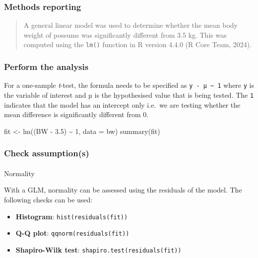 \documentclass[
  letterpaper,
  DIV=11,
  numbers=noendperiod]{scrartcl}
\makeatletter
\let\oldparagraph\paragraph
\renewcommand{\paragraph}{
    \@ifstar
      \xxxParagraphStar
      \xxxParagraphNoStar
  }
\newcommand{\xxxParagraphStar}[1]{\oldparagraph*{#1}\mbox{}}
\newcommand{\xxxParagraphNoStar}[1]{\oldparagraph{#1}\mbox{}}
\newenvironment{Shaded}{\begin{snugshade}}{\end{snugshade}}
\newcommand{\AttributeTok}[1]{\textcolor[rgb]{0.40,0.45,0.13}{#1}}
\newcommand{\DecValTok}[1]{\textcolor[rgb]{0.68,0.00,0.00}{#1}}
\newcommand{\FloatTok}[1]{\textcolor[rgb]{0.68,0.00,0.00}{#1}}
\newcommand{\FunctionTok}[1]{\textcolor[rgb]{0.28,0.35,0.67}{#1}}
\newcommand{\NormalTok}[1]{\textcolor[rgb]{0.00,0.23,0.31}{#1}}
\newcommand{\OtherTok}[1]{\textcolor[rgb]{0.00,0.23,0.31}{#1}}
\newcommand{\SpecialCharTok}[1]{\textcolor[rgb]{0.37,0.37,0.37}{#1}}
\providecommand{\tightlist}{%
  \setlength{\itemsep}{0pt}\setlength{\parskip}{0pt}}\usepackage{longtable,booktabs,array}
\makeatother
\begin{document}
\subsubsection{Methods reporting}\label{methods-reporting-1}

\begin{quote}
A general linear model was used to determine whether the mean body
weight of possums was significantly different from 3.5 kg. This was
computed using the \texttt{lm()} function in R version 4.4.0 (R Core
Team, 2024).
\end{quote}

\subsubsection{Perform the analysis}\label{perform-the-analysis-1}

For a one-sample \emph{t}-test, the formula needs to be specified as
\texttt{y\ -\ µ\ \textasciitilde{}\ 1} where \texttt{y} is the variable
of interest and µ is the hypothesised value that is being tested. The
\texttt{1} indicates that the model has an intercept only i.e.~we are
testing whether the mean difference is significantly different from 0.

\begin{Shaded}
\begin{Highlighting}[]
\NormalTok{fit }\OtherTok{\textless{}{-}} \FunctionTok{lm}\NormalTok{((BW }\SpecialCharTok{{-}} \FloatTok{3.5}\NormalTok{) }\SpecialCharTok{\textasciitilde{}} \DecValTok{1}\NormalTok{, }\AttributeTok{data =}\NormalTok{ bw)}
\FunctionTok{summary}\NormalTok{(fit)}
\end{Highlighting}
\end{Shaded}

\subsubsection{Check assumption(s)}\label{check-assumptions-1}

\paragraph{Normality}\label{normality-1}

With a GLM, normality can be assessed using the residuals of the model.
The following checks can be used:

\begin{itemize}
\tightlist
\item
  \textbf{Histogram}: \texttt{hist(residuals(fit))}
\item
  \textbf{Q-Q plot}: \texttt{qqnorm(residuals(fit))}
\item
  \textbf{Shapiro-Wilk test}: \texttt{shapiro.test(residuals(fit))}
\end{itemize}
\end{document}

